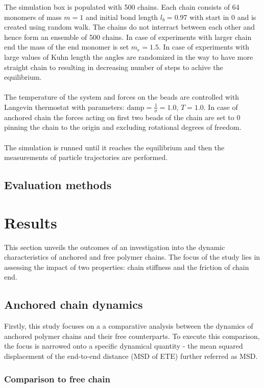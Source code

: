 \documentclass[
    paper=A4,pagesize=automedia,fontsize=12pt,
    BCOR=15mm,DIV=22,
    twoside,headinclude,footinclude=false,
    ngerman,fleqn,             %
    bibliography=totocnumbered,          %
    listof=totoc,                %
    listof=flat,                 %
    cleardoublepage=empty      %
    numbers=endperiod
]{scrartcl}
\begin{document}
The simulation box is populated with 500 chains. Each chain consists of 64 monomers of mass $m=1$
and initial bond length $l_b=0.97$ with start in $0$ and is created using random walk. 
The chains do not interract between each other and hence form
an ensemble of 500 chains. In case of experiments with larger chain end the mass of the end monomer
is set $m_e=1.5$. In case of experiments with large values of Kuhn length the angles are randomized in 
the way to have more straight chain to resulting in decreasing number of steps to achive the
equilibrium.
\\
\\
The temperature of the system and forces on the beads are controlled with
Langevin thermostat with parameters: $\text{damp}=\frac{1}{\sigma}=1.0$, $T=1.0$. In case of anchored
chain the forces acting on first two beads of the chain are set to 0 pinning the chain to the origin
and excluding rotational degrees of freedom.
\\
\\
The simulation is runned until it reaches the equilibrium and then the measurements
of particle trajectories are performed. 

\subsection{Evaluation methods}

\section{Results}
This section unveils the outcomes of an investigation into the dynamic
characteristics of anchored and free polymer chains. 
The focus of the study lies in assessing the impact 
of two properties: chain stiffness and the friction of chain end.

\subsection{Anchored chain dynamics}
Firstly, this study focuses on a a comparative analysis between the 
dynamics of anchored polymer chains and their free counterparts.
To execute this comparison, the focus is narrowed onto a specific dynamical
quantity - the mean squared displacement of the end-to-end distance (MSD of ETE)
further referred as MSD.

\subsubsection{Comparison to free chain}
\end{document}

